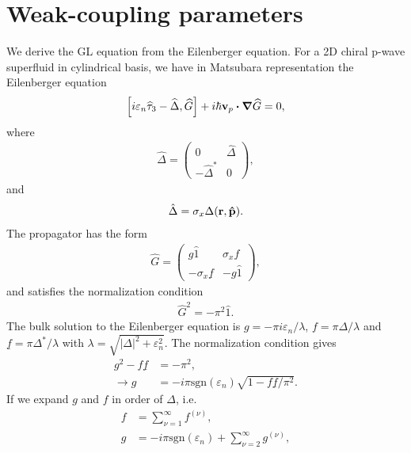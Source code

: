 \documentclass[aps,prb,reprint,groupedaddress]{revtex4-2}
\begin{document}
\section{Weak-coupling parameters}\label{appendix}
We derive the GL equation from the Eilenberger equation. For a 2D chiral p-wave superfluid in cylindrical basis, we have in Matsubara representation the Eilenberger equation
\begin{align}
    \comm{i\varepsilon_n\widehat{\tau}_3-\widehat{\Delta}}{\widehat{G}}+i\hbar\vb{v}_p\vdot\grad{\widehat{G}}=0,
\end{align}
where
\begin{align}
    \widehat{\Delta}=\begin{pmatrix}
                         0               & \hat{\Delta} \\
                         -\hat{\Delta}^* & 0
                     \end{pmatrix},
\end{align}
and
\begin{align}
    \hat{\Delta}=\sigma_x\Delta(\vb{r},\vu{p}).
\end{align}
The propagator has the form
\begin{align}
    \widehat{G}=\begin{pmatrix}
                    g\hat{1}               & \sigma_xf \\
                    -\sigma_x\underline{f} & -g\hat{1}
                \end{pmatrix},
\end{align}
and satisfies the normalization condition
\begin{align}
    \widehat{G}^2=-\pi^2\widehat{1}.
\end{align}
The bulk solution to the Eilenberger equation is $g=-\pi i\varepsilon_n/\lambda$, $f=\pi\Delta/\lambda$ and $\underline{f}=\pi\Delta^*/\lambda$ with $\lambda=\sqrt{|\Delta|^2+\varepsilon_n^2}$. The normalization condition gives
\begin{align}\label{normalization_condition}
    g^2-f\underline{f} & =-\pi^2,\nonumber                                             \\
    \rightarrow g      & =-i\pi\text{sgn}(\varepsilon_n)\sqrt{1-f\underline{f}/\pi^2}.
\end{align}
If we expand $g$ and $f$ in order of $\Delta$, i.e.
\begin{align}
    f & =\sum_{\nu=1}^\infty f^{(\nu)},                                \\
    g & =-i\pi\text{sgn}(\varepsilon_n)+\sum_{\nu=2}^\infty g^{(\nu)},
\end{align}
\end{document}
